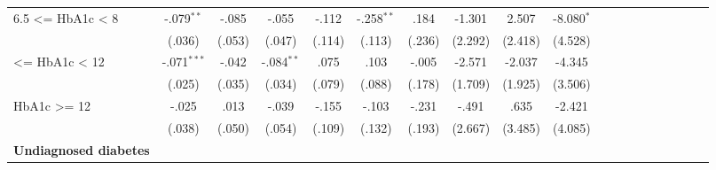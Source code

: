 \documentclass[12pt,english,british]{article}
\newcommand{\sym}[1]{\ensuremath{^{#1}}} %
\begin{document}
\begin{table}[h!]
\begin{center}
\begin{adjustbox}{max width=\textwidth}
{\begin{tabular}{l*{9}{SS}}
6.5 <= HbA1c < 8&    -.079\sym{**} &    -.085         &    -.055         &    -.112         &    -.258\sym{**} &     .184         &   -1.301         &    2.507         &   -8.080\sym{*}  \\                 &   (.036)         &   (.053)         &   (.047)         &   (.114)         &   (.113)         &   (.236)         &  (2.292)         &  (2.418)         &  (4.528)         \\  <= HbA1c < 12 &    -.071\sym{***}&    -.042         &    -.084\sym{**} &     .075         &     .103         &    -.005         &   -2.571         &   -2.037         &   -4.345         \\                 &   (.025)         &   (.035)         &   (.034)         &   (.079)         &   (.088)         &   (.178)         &  (1.709)         &  (1.925)         &  (3.506)         \\ \addlinespace HbA1c >= 12     &    -.025         &     .013         &    -.039         &    -.155         &    -.103         &    -.231         &    -.491         &     .635         &   -2.421         \\                 &   (.038)         &   (.050)         &   (.054)         &   (.109)         &   (.132)         &   (.193)         &  (2.667)         &  (3.485)         &  (4.085)         \\ \addlinespace 
\textbf{Undiagnosed diabetes} &&&&&&&& \\

\end{tabular}}
\end{adjustbox}
\end{center}
\end{table}
\end{document}
